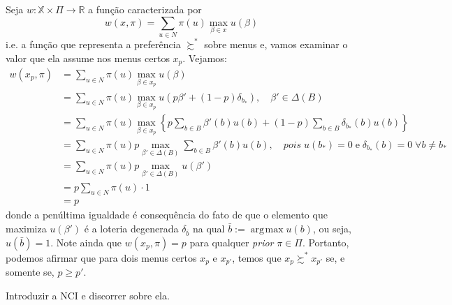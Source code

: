 \documentclass[11pt, a4paper]{article}
\theoremstyle{nonumberplain}
\theoremstyle{plain}
\theoremstyle{plain}
\DeclareMathOperator*{\argmax}{\arg\!\max}
\begin{document}
Seja $w:\mathbb{X}\times \Pi\rightarrow \mathbb{R}$ a função caracterizada por $$w(x,\pi)=\sum_{u\in N} \pi(u)\max_{\beta\in x}u(\beta)$$ i.e. a função que representa a preferência $\succsim^*$ sobre menus e, vamos examinar o valor que ela assume nos menus certos $x_p$. Vejamos:
\begin{align*}
w(x_p,\pi)&=\sum_{u\in N} \pi(u)\max_{\beta\in x_{p}}u(\beta)\\
&= \sum_{u\in N} \pi(u)\max_{\beta\in x_{p}}u(p\beta'+(1-p)\delta_{b_*}),\quad \beta'\in \Delta(B)\\
&=\sum_{u\in N} \pi(u)\max_{\beta\in x_{p}}\left\lbrace p \sum_{b\in B}\beta'(b)u(b)+(1-p)\sum_{b\in B}\delta_{b_*}(b)u(b)\right\rbrace \\
&=\sum_{u\in N} \pi(u)p\max_{\beta'\in \Delta(B)}\sum_{b\in B}\beta'(b)u(b), \quad pois \; u(b_*)=0\; \text{e}\; \delta_{b_*}(b)=0\; \forall b\neq b_*\\
&= \sum_{u\in N} \pi(u) p \max_{\beta'\in \Delta(B)} u(\beta')\\
&= p\sum_{u\in N}\pi(u)\cdot 1\\
&=p
\end{align*}
donde a penúltima igualdade é consequência do fato de que o elemento que maximiza $u(\beta')$ é a loteria degenerada $\delta_{\bar{b}}$ na qual $\bar{b}:=\argmax u(b)$, ou seja, $u(\bar{b})=1$. Note ainda que $w(x_p,\pi)=p$ para qualquer \textit{prior} $\pi\in\Pi$. Portanto, podemos afirmar que para dois menus certos $x_p$ e $x_{p'}$, temos que $x_p\succsim^* x_{p'}$ se, e somente se, $p\geq p'$. 

{\color{blue} Introduzir a NCI e discorrer sobre ela.}
\end{document}
